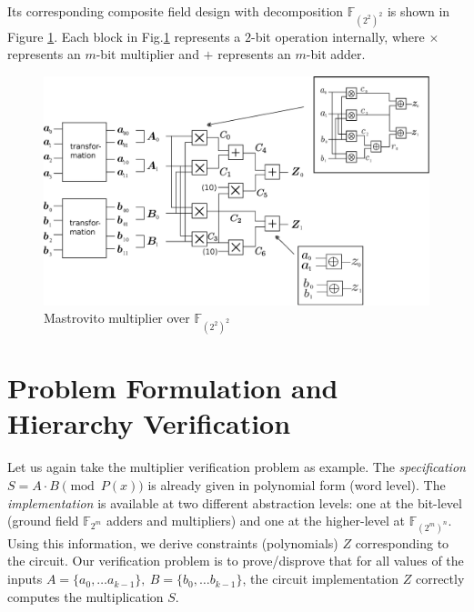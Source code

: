 Its corresponding composite field design with decomposition $\mathbb{F}_{(2^2)^{2}}$ is shown in Figure \ref{fig:mas22}.
Each block in Fig.\ref{fig:mas22} represents a $2$-bit operation internally, where 
$\times$ represents an $m$-bit multiplier and $+$ represents an $m$-bit adder. 

\begin{figure}
\centerline{
\includegraphics[scale=0.50]{./figures/cfmultiplier.eps}
}
\caption{Mastrovito multiplier over $\mathbb{F}_{(2^2)^2}$}
\label{fig:mas22}
\end{figure} 

\section{Problem Formulation and Hierarchy Verification}
\label{sec:setup}

Let us again take the multiplier verification problem as example. 
The {\it specification} $S = A \cdot B \pmod{ P(x)}$ is already given in polynomial form (word level).
The {\it implementation} is available at two different abstraction 
levels: one at the bit-level (ground field $\mathbb{F}_{2^m}$ adders and
multipliers) and one at the higher-level at $\mathbb{F}_{(2^m)^n}$. 
Using this information, we derive constraints (polynomials) $Z$ corresponding to the circuit. 
Our verification problem is to prove/disprove that for all values of the inputs 
$A =\{a_0, \dots a_{k-1}\}, ~B=\{b_0, \dots b_{k-1}\}$, 
the circuit implementation $Z$ correctly computes the multiplication $S$.

